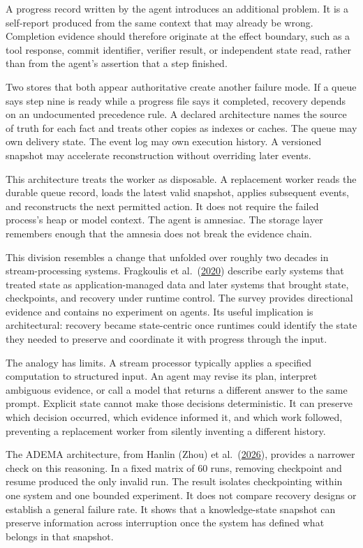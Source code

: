 A progress record written by the agent introduces an additional problem. It is a self-report produced from the same context that may already be wrong. Completion evidence should therefore originate at the effect boundary, such as a tool response, commit identifier, verifier result, or independent state read, rather than from the agent's assertion that a step finished.

Two stores that both appear authoritative create another failure mode. If a queue says step nine is ready while a progress file says it completed, recovery depends on an undocumented precedence rule. A declared architecture names the source of truth for each fact and treats other copies as indexes or caches. The queue may own delivery state. The event log may own execution history. A versioned snapshot may accelerate reconstruction without overriding later events.

This architecture treats the worker as disposable. A replacement worker reads the durable queue record, loads the latest valid snapshot, applies subsequent events, and reconstructs the next permitted action. It does not require the failed process's heap or model context. The agent is amnesiac. The storage layer remembers enough that the amnesia does not break the evidence chain.

This division resembles a change that unfolded over roughly two decades in stream-processing systems. Fragkoulis et al.~(\href{https://arxiv.org/abs/2008.00842}{2020}) describe early systems that treated state as application-managed data and later systems that brought state, checkpoints, and recovery under runtime control. The survey provides directional evidence and contains no experiment on agents. Its useful implication is architectural: recovery became state-centric once runtimes could identify the state they needed to preserve and coordinate it with progress through the input.

The analogy has limits. A stream processor typically applies a specified computation to structured input. An agent may revise its plan, interpret ambiguous evidence, or call a model that returns a different answer to the same prompt. Explicit state cannot make those decisions deterministic. It can preserve which decision occurred, which evidence informed it, and which work followed, preventing a replacement worker from silently inventing a different history.

The ADEMA architecture, from Hanlin (Zhou) et al.~(\href{https://arxiv.org/abs/2604.25849}{2026}), provides a narrower check on this reasoning. In a fixed matrix of 60 runs, removing checkpoint and resume produced the only invalid run. The result isolates checkpointing within one system and one bounded experiment. It does not compare recovery designs or establish a general failure rate. It shows that a knowledge-state snapshot can preserve information across interruption once the system has defined what belongs in that snapshot.

